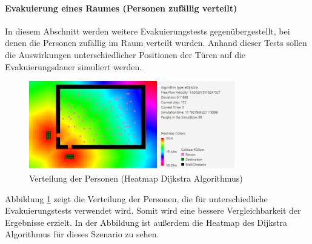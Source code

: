 \paragraph{Evakuierung eines Raumes (Personen zufällig verteilt)}
In diesem Abschnitt werden weitere Evakuierungstests gegenübergestellt, bei denen die Personen zufällig im Raum verteilt wurden. Anhand dieser Tests sollen die Auswirkungen unterschiedlicher Positionen der Türen auf die Evakuierungsdauer simuliert werden.\\

\begin{figure}[htpb]
	\centering
	\includegraphics[width=0.8\textwidth]{abbildungen/Evak1DBegin.PNG}
	\caption{Verteilung der Personen (Heatmap Dijkstra Algorithmus)}
	\label{fig:EvakuierungMap}
\end{figure}

Abbildung \ref{fig:EvakuierungMap} zeigt die Verteilung der Personen, die für unterschiedliche Evakuierungstests verwendet wird. Somit wird eine bessere Vergleichbarkeit der Ergebnisse erzielt. In der Abbildung ist außerdem die Heatmap des Dijkstra Algorithmus für dieses Szenario zu sehen. 

